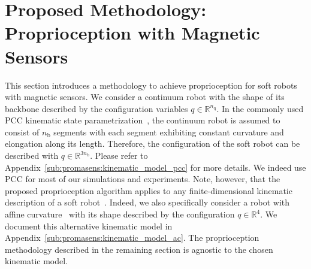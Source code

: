 
\section{Proposed Methodology: Proprioception with Magnetic Sensors}\label{sec:promasens:methodology}

This section introduces a methodology to achieve proprioception for soft robots with magnetic sensors.
%
We consider a continuum robot with the shape of its backbone described by the configuration variables $q \in \mathbb{R}^{n_\mathrm{q}}$.
In the commonly used \gls{PCC} kinematic state parametrization~\citep{webster2010design}, the continuum robot is assumed to consist of $n_\mathrm{b}$ segments with each segment exhibiting constant curvature and elongation along its length. Therefore, the configuration of the soft robot can be described with $q \in \mathbb{R}^{3n_\mathrm{b}}$.
Please refer to Appendix~\ref{sub:promasens:kinematic_model_pcc} for more details.
We indeed use PCC for most of our simulations and experiments.
Note, however, that the proposed proprioception algorithm applies to any finite-dimensional kinematic description of a soft robot~\citep{armanini2023soft}.
Indeed, we also specifically consider a robot with affine curvature~\citep{della2020soft, stella2023piecewise} with its shape described by the configuration $q \in \mathbb{R}^4$. We document this alternative kinematic model in Appendix~\ref{sub:promasens:kinematic_model_ac}.
The proprioception methodology described in the remaining section is agnostic to the chosen kinematic model.

